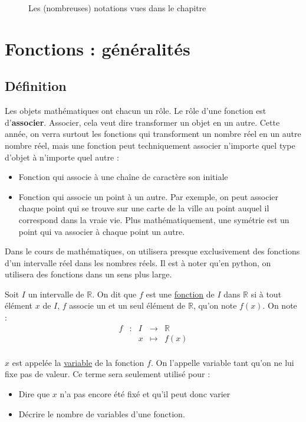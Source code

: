 \documentclass[10pt,a4paper,oneside]{book}
\newcommand{\R}{\mathbb{R}}
\begin{document}
\begin{figure}
\begin{tabular}{|c|p{0.3\linewidth}|p{0.5\linewidth}|}
 \end{tabular}
\caption{Les (nombreuses) notations vues dans le chapitre}
\label{fig:Notations}
\end{figure}


\chapter{Fonctions : généralités}

\section{Définition}

Les objets mathématiques ont chacun un rôle. Le rôle d'une fonction est d'\textbf{associer}. Associer, cela veut dire transformer un objet en un autre. Cette année, on verra surtout les fonctions qui transforment un nombre réel en un autre nombre réel, mais une fonction peut techniquement associer n'importe quel type d'objet à n'importe quel autre :
\begin{itemize}
    \item Fonction qui associe à une chaîne de caractère son initiale
    \item Fonction qui associe un point à un autre. Par exemple, on peut associer chaque point qui se trouve sur une carte de la ville au point auquel il correspond dans la vraie vie. Plus mathématiquement, une symétrie est un point qui va associer à chaque point un autre.
\end{itemize}

Dans le cours de mathématiques, on utilisera presque exclusivement des fonctions d'un intervalle réel dans les nombres réels.  Il est à noter qu'en python, on utilisera des fonctions dans un sens plus large.

\begin{de}[Fonction d'un intervalle de $\R$]
    Soit $I$ un intervalle de $\R$. On dit que $f$ est une \underline{fonction} de $I$ dans $\R$ si à tout élément $x$ de $I$,  $f$ associe un et un seul élément de $\R$, qu'on note $f(x)$.
    On note :
        \[
        \begin{array}{ccccc}
        f & : & I & \to & \R \\
         & & x & \mapsto & f(x) \\
        \end{array}
        \]
\end{de}

$x$ est appelée la \underline{variable} de la fonction $f$. On l'appelle variable tant qu'on ne lui fixe pas de valeur. Ce terme sera seulement utilisé pour : \begin{itemize}
    \item Dire que $x$ n'a pas encore été fixé et qu'il peut donc varier
    \item Décrire le nombre de variables d'une fonction.
\end{itemize}
\end{document}

